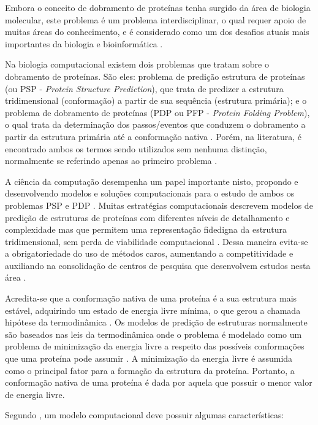 Embora o conceito de dobramento de proteínas tenha surgido da área de biologia molecular, este problema é um problema interdisciplinar, o qual requer apoio de muitas áreas do conhecimento, e é considerado como um dos desafios atuais mais importantes da biologia e bioinformática \cite{nicosia2008generalized}. 

Na biologia computacional existem dois problemas que tratam sobre o dobramento de proteínas. São eles: problema de predição estrutura de proteínas (ou PSP - \textit{Protein Structure Prediction}), que trata de predizer a estrutura tridimensional (conformação) a partir de sua sequência (estrutura primária); e o problema de dobramento de proteínas (PDP ou PFP - \textit{Protein Folding Problem}), o qual trata da determinação dos passos/eventos que conduzem o dobramento a partir da estrutura primária até a conformação nativa \cite{lopes2008evolutionary}. Porém, na literatura, é encontrado ambos os termos sendo utilizados sem nenhuma distinção, normalmente se referindo apenas ao primeiro problema \cite{lopes2008evolutionary}.  

A ciência da computação desempenha um papel importante nisto, propondo e desenvolvendo modelos e soluções computacionais para o estudo de ambos os problemas PSP e PDP \cite{lopes2008evolutionary}. Muitas estratégias computacionais descrevem modelos de predição de estruturas de proteínas com diferentes níveis de detalhamento e complexidade mas que permitem uma representação fidedigna da estrutura tridimensional, sem perda de viabilidade computacional \cite{benitez2015algoritmo}. Dessa maneira  evita-se a obrigatoriedade do uso de métodos caros, aumentando a competitividade e auxiliando na consolidação de centros de pesquisa que desenvolvem estudos nesta área \cite{dill2000polymer}.

Acredita-se que a conformação nativa de uma proteína é a sua estrutura mais estável, adquirindo um estado de energia livre mínima, o que gerou a chamada hipótese da termodinâmica \cite{pedersen2000algorithms}. Os modelos de predição de estruturas normalmente são baseados nas leis da termodinâmica onde o problema é modelado como um problema de minimização da energia livre a respeito das possíveis conformações que uma proteína pode assumir \cite{benitez2015algoritmo}. A minimização da energia livre é assumida como o principal fator para a formação da estrutura da proteína. Portanto, a conformação nativa de uma proteína é dada por aquela que possuir o menor valor de energia livre.

Segundo \cite{pedersen2000algorithms}, um modelo computacional deve possuir algumas características:

